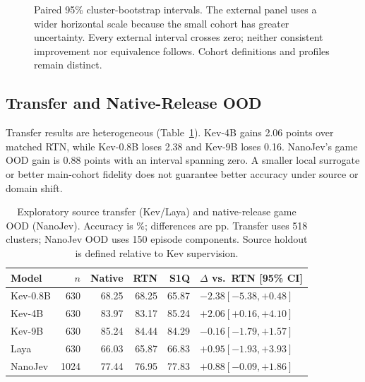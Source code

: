 \documentclass[10pt,twocolumn]{article}
\begin{document}
\begin{figure}[t]
\caption{Paired 95\% cluster-bootstrap intervals. The external panel uses
a wider horizontal scale because the small cohort has greater uncertainty.
Every external interval crosses zero; neither consistent improvement
nor equivalence follows. Cohort definitions and profiles remain distinct.}
\label{fig:intervals}
\end{figure}

\subsection{Transfer and Native-Release OOD}
Transfer results are heterogeneous (Table~\ref{tab:transfer}).
Kev-4B gains 2.06 points over matched RTN, while Kev-0.8B
loses 2.38 and Kev-9B loses 0.16. NanoJev's game OOD gain is
0.88 points with an interval spanning zero. A smaller local surrogate
or better main-cohort fidelity does not guarantee better
accuracy under source or domain shift.

\begin{table}[t]
\centering\small
\begin{tabular}{lrrrrl}
\toprule
Model & $n$ & Native & RTN & S1Q & $\Delta$ vs.\ RTN [95\% CI]\\
\midrule
Kev-0.8B & 630 & 68.25 & 68.25 & 65.87 & $-2.38 [-5.38, +0.48]$ \\
Kev-4B & 630 & 83.97 & 83.17 & 85.24 & $+2.06 [+0.16, +4.10]$ \\
Kev-9B & 630 & 85.24 & 84.44 & 84.29 & $-0.16 [-1.79, +1.57]$ \\
Laya & 630 & 66.03 & 65.87 & 66.83 & $+0.95 [-1.93, +3.93]$ \\
\midrule
NanoJev & 1024 & 77.44 & 76.95 & 77.83 & $+0.88 [-0.09, +1.86]$ \\
\bottomrule
\end{tabular}
\caption{Exploratory source transfer (Kev/Laya) and native-release game
OOD (NanoJev). Accuracy is \%; differences are pp.
Transfer uses 518 clusters; NanoJev OOD uses 150 episode components.
Source holdout is defined relative to Kev supervision.}
\label{tab:transfer}
\end{table}
\end{document}
